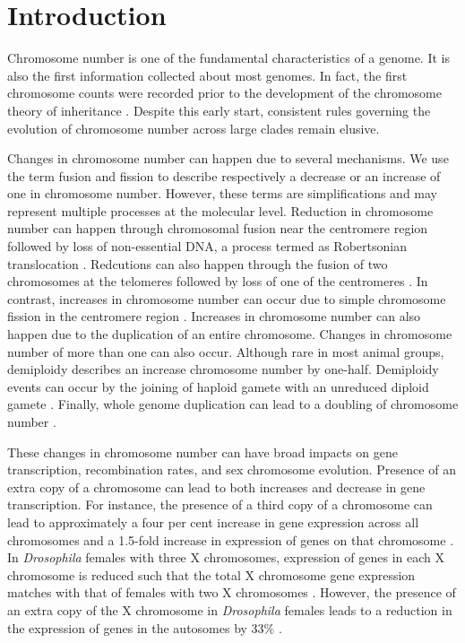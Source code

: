 \section{Introduction}

Chromosome number is one of the fundamental characteristics of a genome.
It is also the first information collected about most genomes. 
In fact, the first chromosome counts were recorded prior to the development of the chromosome theory of inheritance \citep{flemming1882}.
Despite this early start, consistent rules governing the evolution of chromosome number across large clades remain elusive. 

Changes in chromosome number can happen due to several mechanisms.
We use the term fusion and fission to describe respectively a decrease or an increase of one in chromosome number.
However, these terms are simplifications and may represent multiple processes at the molecular level.
Reduction in chromosome number can happen through chromosomal fusion near the centromere region followed by loss of non-essential DNA, a process termed as Robertsonian translocation \citep{garagna1995}. %
Redcutions can also happen through the fusion of two chromosomes at the telomeres followed by loss of one of the centromeres \citep{gordon2011mechanisms, miga2016}.
In contrast, increases in chromosome number can occur due to simple chromosome fission in the centromere region \citep{moretti1984}.
Increases in chromosome number can also happen due to the duplication of an entire chromosome.
Changes in chromosome number of more than one can also occur.
Although rare in most animal groups, demiploidy describes an increase chromosome number by one-half. 
Demiploidy events can occur by the joining of haploid gamete with an unreduced diploid gamete \citep{hornsey1973}.
Finally, whole genome duplication can lead to a doubling of chromosome number \citep{beccak1970}.

These changes in chromosome number can have broad impacts on gene transcription, recombination rates, and sex chromosome evolution.
Presence of an extra copy of a chromosome can lead to both increases and decrease in gene transcription.  
For instance, the presence of a third copy of a chromosome can lead to approximately a four per cent increase in gene expression across all chromosomes and a 1.5-fold increase in expression of genes on that chromosome \citep{lockstone2007, williams2008aneuploidy}.
In \textit{Drosophila} females with three X chromosomes, expression of genes in each X chromosome is reduced such that the total X chromosome gene expression matches with that of females with two X chromosomes \citep{sun2013dosage}.
However, the presence of an extra copy of the X chromosome in \textit{Drosophila} females leads to a reduction in the expression of genes in the autosomes by 33\% \citep{sun2013dosage}. 

